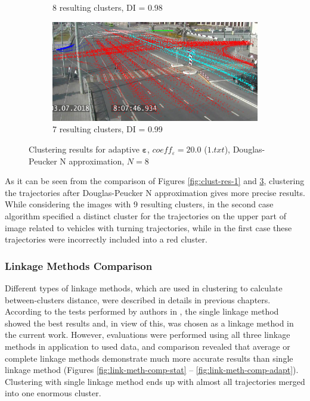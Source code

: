 \begin{figure}[!htb]
\begin{subfigure}[!htb]{0.495\textwidth}
		\caption{8 resulting clusters, DI = 0.98}
		\label{fig:8cl-rdp-n-1}
	\end{subfigure}
	\hfill
	\begin{subfigure}[!htb]{0.495\textwidth}
		\centering{}
		\includegraphics[width=\textwidth]{images/7cl-rdp-n-1.png}
		\caption{7 resulting clusters, DI = 0.99}
		\label{fig:7cl-rdp-n-1}
	\end{subfigure}
	\caption{Clustering results for adaptive $\bm{\varepsilon}$, $coeff_\varepsilon = 20.0$ ($1.txt$), Douglas-Peucker N approximation, $N = 8$}
	\label{fig:clust-res-1-rdp-n}
\end{figure}

As it can be seen from the comparison of Figures \ref{fig:clust-res-1} and \ref{fig:clust-res-1-rdp-n}, clustering the trajectories after Douglas-Peucker N approximation gives more precise results. While considering the images with 9 resulting clusters, in the second case algorithm specified a distinct cluster for the trajectories on the upper part of image related to vehicles with turning trajectories, while in the first case these trajectories were incorrectly included into a red cluster.

\subsubsection{Linkage Methods Comparison}

Different types of linkage methods, which are used in clustering to calculate between-clusters distance, were described in details in previous chapters. According to the tests performed by authors in \cite{inproceedings:7_related_work}, the single linkage method showed the best results and, in view of this, was chosen as a linkage method in the current work. However, evaluations were performed using all three linkage methods in application to used data, and comparison  revealed that average or complete linkage methods demonstrate much more accurate results than single linkage method (Figures \ref{fig:link-meth-comp-stat} -- \ref{fig:link-meth-comp-adapt}). Clustering with single linkage method ends up with almost all trajectories merged into one enormous cluster.

